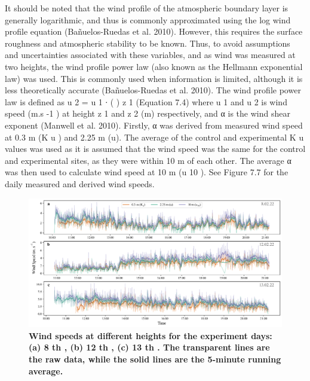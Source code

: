 \documentclass[final,3p,times,authoryear]{elsarticle}
\begin{document}
It should be noted that the wind profile of the atmospheric boundary layer is generally
logarithmic, and thus is commonly approximated using the log wind profile equation
(Bañuelos-Ruedas et al. 2010). However, this requires the surface roughness and
atmospheric stability to be known. Thus, to avoid assumptions and uncertainties
associated with these variables, and as wind was measured at two heights, the wind
profile power law (also known as the Hellmann exponential law) was used. This is
commonly used when information is limited, although it is less theoretically accurate
(Bañuelos-Ruedas et al. 2010).
The wind profile power law is defined as
u 2 = u 1 ∙ ( )
z 1
(Equation 7.4)
where u 1 and u 2 is wind speed (m.s -1 ) at height z 1 and z 2 (m) respectively, and α is the
wind shear exponent (Manwell et al. 2010). Firstly, α was derived from measured wind
speed at 0.3 m (K u ) and 2.25 m (u). The average of the control and experimental K u
values was used as it is assumed that the wind speed was the same for the control and
experimental sites, as they were within 10 m of each other. The average α was then used
to calculate wind speed at 10 m (u 10 ). See Figure 7.7 for the daily measured and derived
wind speeds.

\begin{figure}
\centering
\includegraphics[trim={0 0 0 0},clip,scale=1.0]{pict024.png}
\caption{\bf Wind speeds at different heights for the experiment days: (a) 8 th , (b) 12 th , (c) 13 th . The
transparent lines are the raw data, while the solid lines are the 5-minute running average.}
 \label{fig:7.7}
\end{figure}

\end{document}
